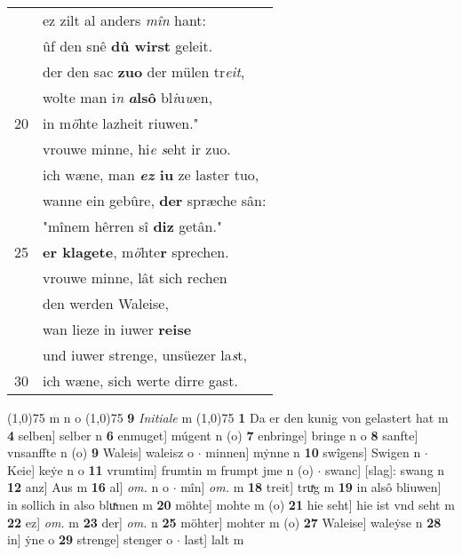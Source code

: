 \documentclass[8pt,a4paper,notitlepage]{article}
\begin{document}
\begin{table}[ht]
\begin{minipage}[t]{0.5\linewidth}
\begin{tabular}{rl}
 & ez zilt al anders \textit{mîn} hant:\\ 
 & ûf den snê \textbf{dû wirst} geleit.\\ 
 & der den sac \textbf{zuo} der mülen tr\textit{eit},\\ 
 & wolte man i\textit{n} \textbf{\textit{a}lsô} bl\textit{i}u\textit{w}en,\\ 
20 & in m\textit{ö}hte lazheit riuwen."\\ 
 & vrouwe minne, hi\textit{e s}eht ir zuo.\\ 
 & ich wæne, man \textbf{\textit{ez} iu} ze laster tuo,\\ 
 & wanne ein gebûre, \textbf{der} spræche sân:\\ 
 & "mînem hêrren sî \textbf{diz} getân."\\ 
25 & \textbf{er klagete}, m\textit{ö}hte\textbf{r} sprechen.\\ 
 & vrouwe minne, lât sich rechen\\ 
 & den werden Waleise,\\ 
 & wan lieze in iuwer \textbf{reise}\\ 
 & und iuwer strenge, unsüezer la\textit{s}t,\\ 
30 & ich wæne, sich werte dirre gast.\\ 
\end{tabular}
\scriptsize
\line(1,0){75} \newline
m n o \newline
\line(1,0){75} \newline
\textbf{9} \textit{Initiale} m  \newline
\line(1,0){75} \newline
\textbf{1} Da er den kunig von gelastert hat m \textbf{4} selben] selber n \textbf{6} enmuget] múgent n (o) \textbf{7} enbringe] bringe n o \textbf{8} sanfte] vnsanffte n (o) \textbf{9} Waleis] waleisz o  $\cdot$ minnen] mẏnne n \textbf{10} swîgens] Swigen n  $\cdot$ Keie] keẏe n o \textbf{11} vrumtim] frumtin m frumpt jme n (o)  $\cdot$ swanc] [slag]: swang n \textbf{12} anz] Aus m \textbf{16} al] \textit{om.} n o  $\cdot$ mîn] \textit{om.} m \textbf{18} treit] truͯg m \textbf{19} in alsô bliuwen] in sollich in also bluͯmen m \textbf{20} möhte] mohte m (o) \textbf{21} hie seht] hie ist vnd seht m \textbf{22} ez] \textit{om.} m \textbf{23} der] \textit{om.} n \textbf{25} möhter] mohter m (o) \textbf{27} Waleise] waleẏse n \textbf{28} in] ẏne o \textbf{29} strenge] stenger o  $\cdot$ last] lalt m \newline
\end{minipage}
\end{table}
\end{document}
